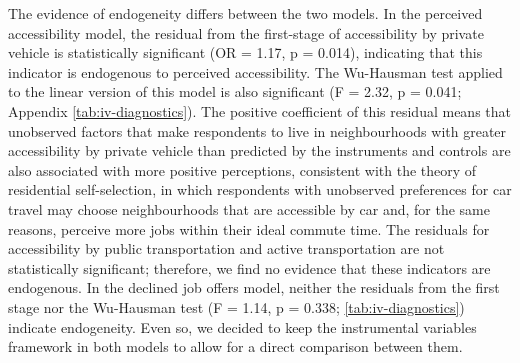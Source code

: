 \documentclass[preprint, 3p,
authoryear]{elsarticle} %
\begin{document}
The evidence of endogeneity differs between the two models. In the
perceived accessibility model, the residual from the first-stage of
accessibility by private vehicle is statistically significant (OR =
1.17, p = 0.014), indicating that this indicator is endogenous to
perceived accessibility. The Wu-Hausman test applied to the linear
version of this model is also significant (F = 2.32, p = 0.041; Appendix
\ref{tab:iv-diagnostics}). The positive coefficient of this residual
means that unobserved factors that make respondents to live in
neighbourhoods with greater accessibility by private vehicle than
predicted by the instruments and controls are also associated with more
positive perceptions, consistent with the theory of residential
self-selection, in which respondents with unobserved preferences for car
travel may choose neighbourhoods that are accessible by car and, for the
same reasons, perceive more jobs within their ideal commute time. The
residuals for accessibility by public transportation and active
transportation are not statistically significant; therefore, we find no
evidence that these indicators are endogenous. In the declined job
offers model, neither the residuals from the first stage nor the
Wu-Hausman test (F = 1.14, p = 0.338; \ref{tab:iv-diagnostics}) indicate
endogeneity. Even so, we decided to keep the instrumental variables
framework in both models to allow for a direct comparison between them.
\end{document}
